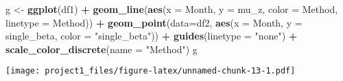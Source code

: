 \documentclass[
]{article}
\newenvironment{Shaded}{\begin{snugshade}}{\end{snugshade}}
\newcommand{\DataTypeTok}[1]{\textcolor[rgb]{0.13,0.29,0.53}{#1}}
\newcommand{\KeywordTok}[1]{\textcolor[rgb]{0.13,0.29,0.53}{\textbf{#1}}}
\newcommand{\NormalTok}[1]{#1}
\newcommand{\OperatorTok}[1]{\textcolor[rgb]{0.81,0.36,0.00}{\textbf{#1}}}
\newcommand{\StringTok}[1]{\textcolor[rgb]{0.31,0.60,0.02}{#1}}
\begin{document}
\begin{Shaded}
\begin{Highlighting}[]
\NormalTok{g \textless{}{-}}\StringTok{ }\KeywordTok{ggplot}\NormalTok{(df1) }\OperatorTok{+}
\StringTok{  }\KeywordTok{geom\_line}\NormalTok{(}\KeywordTok{aes}\NormalTok{(}\DataTypeTok{x =}\NormalTok{ Month, }\DataTypeTok{y =}\NormalTok{ mu\_z, }\DataTypeTok{color =}\NormalTok{ Method, }\DataTypeTok{linetype =}\NormalTok{ Method)) }\OperatorTok{+}
\StringTok{  }\KeywordTok{geom\_point}\NormalTok{(}\DataTypeTok{data=}\NormalTok{df2, }\KeywordTok{aes}\NormalTok{(}\DataTypeTok{x =}\NormalTok{ Month, }\DataTypeTok{y =}\NormalTok{ single\_beta, }\DataTypeTok{color =} \StringTok{"single\_beta"}\NormalTok{)) }\OperatorTok{+}
\StringTok{  }\KeywordTok{guides}\NormalTok{(}\DataTypeTok{linetype =} \StringTok{"none"}\NormalTok{) }\OperatorTok{+}
\StringTok{  }\KeywordTok{scale\_color\_discrete}\NormalTok{(}\DataTypeTok{name =} \StringTok{"Method"}\NormalTok{)}
\NormalTok{g}
\end{Highlighting}
\end{Shaded}

\texttt{[image: project1\_files/figure-latex/unnamed-chunk-13-1.pdf]}
\end{document}
